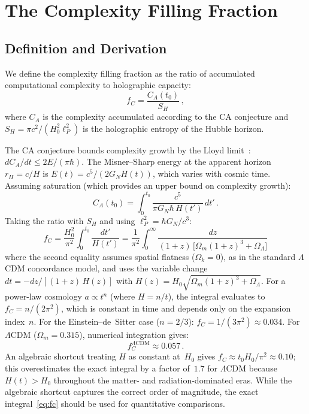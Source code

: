 \documentclass[12pt,a4paper]{article}
\theoremstyle{remark}
\begin{document}
\section{The Complexity Filling Fraction}

\subsection{Definition and Derivation}

We define the complexity filling fraction as the ratio of accumulated computational complexity to holographic capacity:
\begin{equation}
f_C = \frac{C_A(t_0)}{S_H}\,,
\end{equation}
where $C_A$ is the complexity accumulated according to the CA conjecture and $S_H = \pi c^2/(H_0^2 \ell_P^2)$ is the holographic entropy of the Hubble horizon.

The CA conjecture bounds complexity growth by the Lloyd limit~\cite{Lloyd2000}: $dC_A/dt \le 2E/(\pi\hbar)$.
The Misner--Sharp energy at the apparent horizon $r_H = c/H$ is $E(t) = c^5/(2G_N H(t))$, which varies with cosmic time.
Assuming saturation (which provides an upper bound on complexity growth):
\begin{equation}\label{eq:CA}
C_A(t_0) = \int_0^{t_0} \frac{c^5}{\pi G_N \hbar\, H(t')}\,dt'\,.
\end{equation}
Taking the ratio with $S_H$ and using $\ell_P^2 = \hbar G_N/c^3$:
\begin{equation}\label{eq:fc}
\boxed{f_C = \frac{H_0^2}{\pi^2}\int_0^{t_0}\frac{dt'}{H(t')} = \frac{1}{\pi^2}\int_0^\infty \frac{dz}{(1+z)\,\bigl[\Omega_m(1+z)^3+\Omega_\Lambda\bigr]}}
\end{equation}
where the second equality assumes spatial flatness ($\Omega_k = 0$), as in the standard $\Lambda$CDM concordance model, and uses the variable change $dt = -dz/[(1+z)\,H(z)]$ with $H(z) = H_0\sqrt{\Omega_m(1+z)^3 + \Omega_\Lambda}$.
For a power-law cosmology $a\propto t^n$ (where $H = n/t$), the integral evaluates to $f_C = n/(2\pi^2)$, which is constant in time and depends only on the expansion index~$n$.
For the Einstein--de~Sitter case ($n=2/3$): $f_C = 1/(3\pi^2) \approx 0.034$.
For $\Lambda$CDM ($\Omega_m = 0.315$), numerical integration gives:
\begin{equation}
f_C^{\Lambda\mathrm{CDM}} \approx 0.057\,.
\end{equation}
An algebraic shortcut treating $H$ as constant at~$H_0$ gives $f_C \approx t_0 H_0/\pi^2 \approx 0.10$; this overestimates the exact integral by a factor of~$1.7$ for $\Lambda$CDM because $H(t) > H_0$ throughout the matter- and radiation-dominated eras.
While the algebraic shortcut captures the correct order of magnitude, the exact integral~\eqref{eq:fc} should be used for quantitative comparisons.
\end{document}
